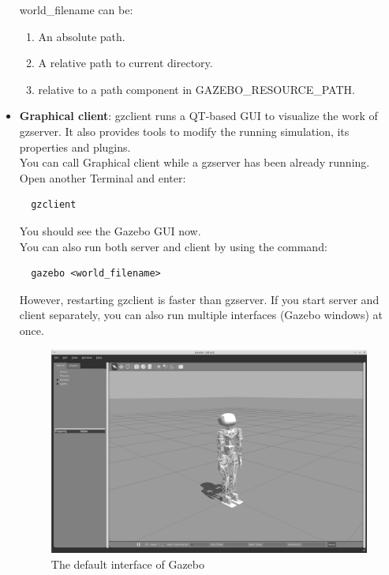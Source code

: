 \documentclass[pdftex,12pt,a4paper]{article}
\begin{document}
\begin{itemize}
  \newpage
  world\_filename can be:
  \begin{enumerate}
  \item An absolute path.
  \item A relative path to current directory.
  \item relative to a path component in GAZEBO\_RESOURCE\_PATH.
  \end{enumerate}
  \item \textbf{Graphical client}: gzclient runs a QT-based GUI to visualize the work of gzserver. It also provides tools to modify the running simulation, its properties and plugins.\\
  You can call Graphical client while a gzserver has been already running. Open another Terminal and enter:
  \begin{lstlisting}
  gzclient
  \end{lstlisting}
  You should see the Gazebo GUI now.\\
  You can also run both server and client by using the command:
  \begin{lstlisting}
  gazebo <world_filename>
  \end{lstlisting}
  However, restarting gzclient is faster than gzserver. If you start server and client separately, you can also run multiple interfaces (Gazebo windows) at once.
  \begin{figure}[h]
      \centering
      \includegraphics[width=0.9\linewidth]{image/gazebo_default.png}
      \caption{The default interface of Gazebo}
      \label{fig:gazebo_default}
  \end{figure}
  
  \end{itemize}
  
  
\end{document}
